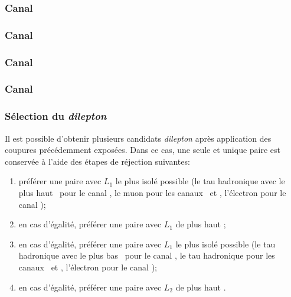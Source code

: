 \subsubsection{Canal \tauh\tauh}\label{chapter-HTT_analysis-section-offline-tt}
\subsubsection{Canal \mu\tauh}\label{chapter-HTT_analysis-section-offline-mt}
\subsubsection{Canal \ele\tauh}\label{chapter-HTT_analysis-section-offline-et}
\subsubsection{Canal \ele\mu}\label{chapter-HTT_analysis-section-offline-em}



\subsubsection{Sélection du \emph{dilepton}}\label{chapter-HTT_analysis-section-offline-dilepton}
Il est possible d'obtenir plusieurs candidats \emph{dilepton} après application des coupures précédemment exposées.
Dans ce cas, une seule et unique paire est conservée à l'aide des étapes de réjection suivantes:
\begin{enumerate}
\item préférer une paire avec $L_1$ le plus isolé possible (le tau hadronique avec le plus haut \pT\ pour le canal \tauh\tauh, le muon pour les canaux \muon\tauh\ et \ele\muon, l'électron pour le canal \ele\tauh);
\item en cas d'égalité, préférer une paire avec $L_1$ de plus haut \pT;
\item en cas d'égalité, préférer une paire avec $L_1$ le plus isolé possible (le tau hadronique avec le plus bas \pT\ pour le canal \tauh\tauh, le tau hadronique pour les canaux \muon\tauh\ et \ele\tauh, l'électron pour le canal \ele\muon);
\item en cas d'égalité, préférer une paire avec $L_2$ de plus haut \pT.
\end{enumerate}